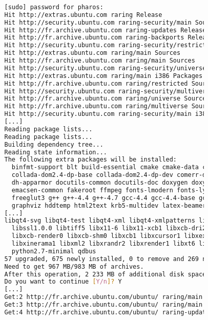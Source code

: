 \documentclass[a4paper,10pt,twoside]{book}
\begin{document}
				\label{install:hydro}
				\begin{lstlisting}[language=bash,title={\installationTool{} Installing Hydro in Ubuntu: Raring - Output}]
				
				[sudo] password for pharos:
				Hit http://extras.ubuntu.com raring Release
				Hit http://security.ubuntu.com raring-security/main Sources
				Hit http://fr.archive.ubuntu.com raring-updates Release
				Hit http://fr.archive.ubuntu.com raring-backports Release
				Hit http://security.ubuntu.com raring-security/restricted Sources
				Hit http://extras.ubuntu.com raring/main Sources
				Hit http://fr.archive.ubuntu.com raring/main Sources
				Hit http://security.ubuntu.com raring-security/universe Sources
				Hit http://extras.ubuntu.com raring/main i386 Packages
				Hit http://fr.archive.ubuntu.com raring/restricted Sources
				Hit http://security.ubuntu.com raring-security/multiverse Sources
				Hit http://fr.archive.ubuntu.com raring/universe Sources
				Hit http://fr.archive.ubuntu.com raring/multiverse Sources
				Hit http://security.ubuntu.com raring-security/main i386 Packages
				[...]
				Reading package lists...
				Reading package lists...
				Building dependency tree...
				Reading state information...
				The following extra packages will be installed:
				  binfmt-support blt build-essential cmake cmake-data collada-dom-dev
				  collada-dom2.4-dp-base collada-dom2.4-dp-dev comerr-dev cpp-4.4 debhelper
				  dh-apparmor docutils-common docutils-doc doxygen doxygen-latex dpkg-dev
				  emacsen-common fakeroot ffmpeg fonts-lmodern fonts-lyx fonts-texgyre
				  freeglut3 g++ g++-4.4 g++-4.7 gcc-4.4 gcc-4.4-base gccxml gir1.2-gtk-2.0
				  graphviz hddtemp html2text krb5-multidev latex-beamer latex-xcolor
				[...]
				libqt4-svg libqt4-test libqt4-xml libqt4-xmlpatterns libqtcore4 libqtgui4
				  libssl1.0.0 libtiff5 libx11-6 libx11-xcb1 libxcb-dri2-0 libxcb-glx0
				  libxcb-render0 libxcb-shm0 libxcb1 libxcursor1 libxext6 libxfixes3 libxi6
				  libxinerama1 libxml2 libxrandr2 libxrender1 libxt6 libxxf86vm1 python2.7
				  python2.7-minimal qdbus
				57 upgraded, 675 newly installed, 0 to remove and 269 not upgraded.
				Need to get 967 MB/983 MB of archives.
				After this operation, 2 233 MB of additional disk space will be used.
				Do you want to continue [Y/n]? Y
				[...]
				Get:2 http://fr.archive.ubuntu.com/ubuntu/ raring/main libgfortran3 i386 4.7.3-1ubuntu1 [326 kB]
				Get:3 http://fr.archive.ubuntu.com/ubuntu/ raring/main libglade2-0 i386 1:2.6.4-1ubuntu2 [52,9 kB]
				Get:4 http://fr.archive.ubuntu.com/ubuntu/ raring-updates/main libgnutls-openssl27 i386 2.12.23-1ubuntu1.1 [21,9 kB]

\end{lstlisting}
\end{document}

